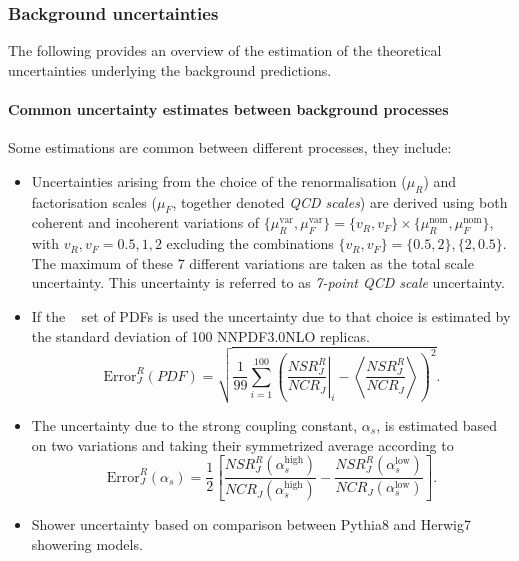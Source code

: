 \subsubsection{Background uncertainties}

The following provides an overview of the estimation of the theoretical uncertainties underlying the background predictions. 

\paragraph{Common uncertainty estimates between background processes}
Some estimations are common between different processes, they include:
\begin{itemize}
    \item Uncertainties arising from the choice of the renormalisation ($\mu_R$) and factorisation scales ($\mu_F$, together denoted \emph{QCD scales}) are derived using both coherent and incoherent variations of $\{\mu^{\text{var}}_R , \mu^{\text{var}}_F \} = \{v_R, v_F \} \times \{\mu^{\text{nom}}_R , \mu^{\text{nom}}_F \}$, with $v_R, v_F = 0.5, 1, 2$ excluding the combinations $\{v_R, v_F \} = \{0.5, 2\}, \{2, 0.5\}$. 
    The maximum of these 7 different variations are taken as the total scale uncertainty. This uncertainty is referred to as \emph{7-point QCD scale} uncertainty.
    \item If the \nnpdfnnlo~\cite{Ball:2014uwa} set of PDFs is used the uncertainty due to that choice is estimated by the standard deviation of 100 NNPDF3.0NLO replicas. 
    \begin{equation}
    \text{Error}^{R}_{J}(PDF)=\sqrt{\frac{1}{99}\sum_{i=1}^{100}\left(\left.\frac{NSR^R_J}{NCR_J}\right|_i-\left\langle\frac{NSR^R_J}{NCR_J}\right\rangle\right)^2}.
    \end{equation}
    \item The uncertainty due to the strong coupling constant, $\alpha_s$, is estimated based on two variations and taking their symmetrized average according to
     \begin{equation}
        \text{Error}^{R}_{J}(\alpha_s)=\frac{1}{2}\left[\frac{NSR^R_J(\alpha_s^{\text{high}})}{NCR_J(\alpha_s^{\text{high}})}-\frac{NSR^R_J(\alpha_s^{\text{low}})}{NCR_J(\alpha_s^{\text{low}})}\right].
    \end{equation}
    \item Shower uncertainty based on comparison between Pythia8 and Herwig7 showering models.
\end{itemize}

